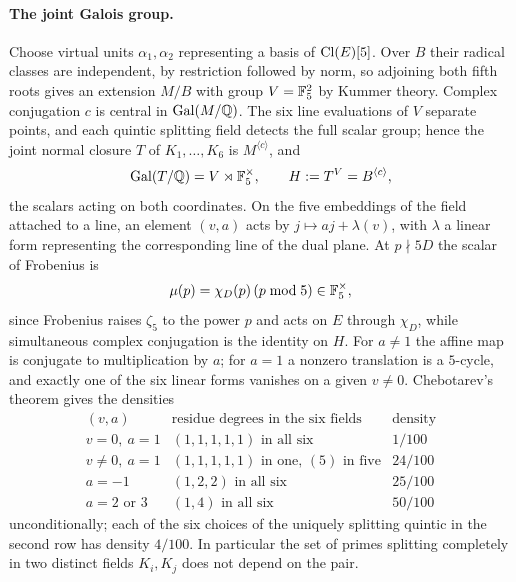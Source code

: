 \paragraph{The joint Galois group.}
Choose virtual units $\alpha_1,\alpha_2$ representing a basis of
$\operatorname{Cl}(E)[5]$. Over $B$ their radical classes are independent, by restriction
followed by norm, so adjoining both fifth roots gives an extension $M/B$ with
group $V=\mathbb{F}_5^2$ by Kummer theory. Complex conjugation $c$ is central in
$\operatorname{Gal}(M/\mathbb{Q})$. The six line evaluations of $V$ separate points, and each
quintic splitting field detects the full scalar group; hence the joint normal
closure $T$ of $K_1,\dots,K_6$ is $M^{\langle c\rangle}$, and
\[
 \operatorname{Gal}(T/\mathbb{Q})=V\rtimes\mathbb{F}_5^\times,\qquad H:=T^V=B^{\langle c\rangle},
\]
the scalars acting on both coordinates. On the five embeddings of the field
attached to a line, an element $(v,a)$ acts by $j\mapsto aj+\lambda(v)$, with
$\lambda$ a linear form representing the corresponding line of the dual
plane. At $p\nmid5D$ the scalar of Frobenius is
\[
 \mu(p)=\chi_D(p)\,(p\bmod5)\in\mathbb{F}_5^\times ,
\]
since Frobenius raises $\zeta_5$ to the power $p$ and acts on $E$ through
$\chi_D$, while simultaneous complex conjugation is the identity on $H$. For
$a\ne1$ the affine map is conjugate to multiplication by $a$; for $a=1$ a
nonzero translation is a $5$-cycle, and exactly one of the six linear forms
vanishes on a given $v\ne0$. Chebotarev's theorem gives the densities
\[
\begin{array}{lll}
 (v,a) & \text{residue degrees in the six fields} & \text{density}\\
 \hline
 v=0,\ a=1 & (1,1,1,1,1)\text{ in all six} & 1/100\\
 v\ne0,\ a=1 & (1,1,1,1,1)\text{ in one, }(5)\text{ in five} & 24/100\\
 a=-1 & (1,2,2)\text{ in all six} & 25/100\\
 a=2\text{ or }3 & (1,4)\text{ in all six} & 50/100
\end{array}
\]
unconditionally; each of the six choices of the uniquely splitting quintic in
the second row has density $4/100$. In particular the set of primes splitting
completely in two distinct fields $K_i,K_j$ does not depend on the pair.

